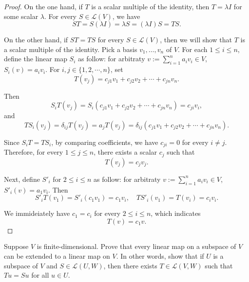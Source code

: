 \documentclass{article}
\begin{document}
\begin{proof}
    On the one hand, if \( T \) is a scalar multiple of the identity, then \( T = \lambda I \) for some scalar \( \lambda \). For every \( S \in \mathcal{L}(V) \), we have
    \[ ST = S(\lambda I) = \lambda S = (\lambda I)S = TS. \]\par
    On the other hand, if \( ST = TS \) for every \( S \in \mathcal{L}(V) \), then we will show that \( T \) is a scalar multiple of the identity. Pick a basis \( v_1, \ldots, v_n \) of \( V \). For each $ 1\le i\le n $, define the linear map $ S_i  $ as follow: for arbitraty $ v:=\sum_{i=1}^{n} a_iv_i\in V $, $ S_i(v)=a_iv_i $. For $ i,j\in\{1,2,\cdots,n\} $, set 
    \[ T(v_j)=c_{j1}v_1+c_{j2}v_2+\cdots+c_{jn}v_n. \] \par
    Then
    \[ S_iT(v_j)=S_i(c_{j1}v_1+c_{j2}v_2+\cdots+c_{jn}v_n)=c_{ji}v_i, \]
    and
    \[ TS_i(v_j)=\delta_{ij}T(v_j)=a_jT(v_j)=\delta_{ij}(c_{j1}v_1+c_{j2}v_2+\cdots+c_{jn}v_n). \]\par
    Since $ S_iT=TS_i $, by comparing coefficients, we have $ c_{ji}=0 $ for every $ i\neq j $. Therefore, for every $ 1\le j\le n $, there exists a scalar $ c_j $ such that
    \[ T(v_j)=c_jv_j. \]\par
    Next, define $ S'_{i} $ for $ 2\le i\le n $ as follow: for arbitraty $ v:=\sum_{i=1}^{n} a_iv_i\in V $, $ S'_{i}(v)=a_1v_i $. Then
    \[ S'_{i}T(v_1)=S'_{i}(c_1v_1)=c_1v_i,\quad TS'_{i}(v_1)=T(v_i)=c_iv_i. \]\par
    We immideiately have $ c_1=c_i $ for every $ 2\le i\le n $, which indicates
    \[ T(v)=c_1v. \] 
\end{proof}

\begin{problem}[3A-13]
    Suppose \( V \) is finite-dimensional. Prove that every linear map on a subspace of \( V \) can be extended to a linear map on \( V \). In other words, show that if \( U \) is a subspace of \( V \) and \( S \in \mathcal{L}(U, W) \), then there exists \( T \in \mathcal{L}(V, W) \) such that \( Tu = Su \) for all \( u \in U \).
\end{problem}
\end{document}
